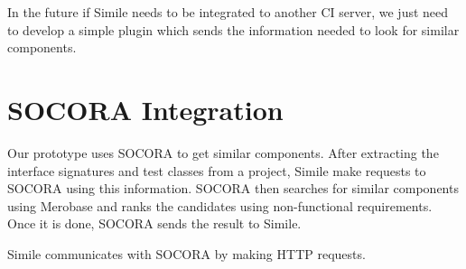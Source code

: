 
In the future if Simile needs to be integrated to another CI server, we just need to develop a simple plugin which sends the information needed to look for similar components.
\section{SOCORA Integration}
Our prototype uses SOCORA to get similar components. After extracting the interface signatures and test classes from a project, Simile make requests to SOCORA using this information. SOCORA then searches for similar components using Merobase and ranks the candidates using non-functional requirements. Once it is done, SOCORA sends the result to Simile. 

Simile communicates with SOCORA by making HTTP requests. 